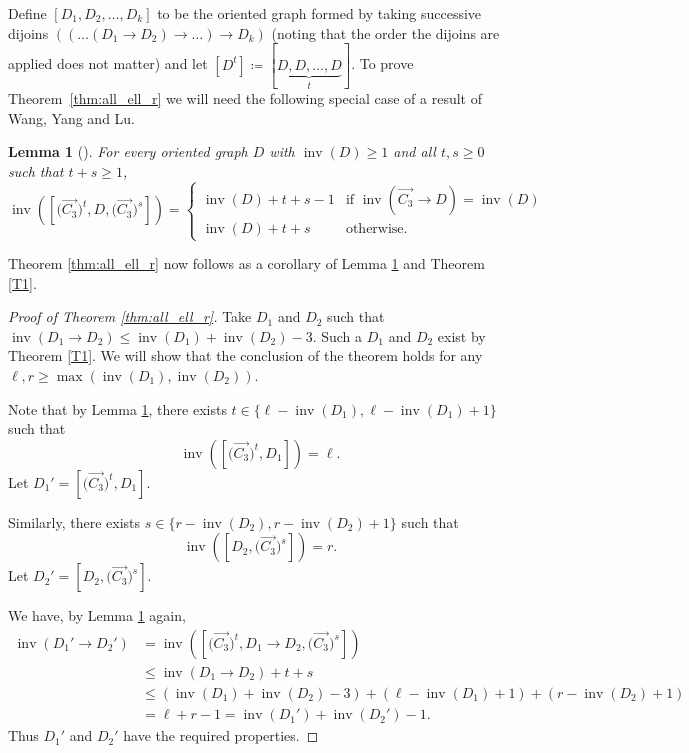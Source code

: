 \documentclass[10pt,a4paper]{amsart}
\numberwithin{equation}{section}
\theoremstyle{plain}
\newtheorem{lemma}[thm]{Lemma}
\theoremstyle{remark}
\theoremstyle{definition}
\newcommand{\lb}{\left(}
\newcommand{\rb}{\right)}
\newcommand{\inv}{\operatorname{inv}}
\begin{document}
Define $[D_1,D_2,\ldots,D_k]$ to be the oriented graph formed by taking successive dijoins $((\ldots(D_1 \rightarrow D_2) \rightarrow \ldots )\rightarrow D_k)$ (noting that the order the dijoins are applied does not matter) and let $[D^t] \coloneqq [\underbrace{D,D,\ldots,D}_{t}]$.
To prove Theorem~\ref{thm:all_ell_r} we will need the following special case of a result of Wang, Yang and Lu.

\begin{lemma}[{\cite[Corollary 1.10]{Wang}}]\label{lem:C3_dijoins}
For every oriented graph $D$ with $\inv(D) \ge 1$ and all $t,s \ge 0$ such that $t+s\ge 1$,
\begin{equation*}
\inv\lb\left[\big(\overrightarrow{C_3}\big)^t,D,\big(\overrightarrow{C_3}\big)^s\right] \rb = \begin{cases} \inv(D) + t +s-1 &\text{if $\inv(\overrightarrow{C_3}\rightarrow D) = \inv(D)$}\\
\inv(D) + t+s &\text{otherwise.}
\end{cases} 
\end{equation*}
\end{lemma}

Theorem \ref{thm:all_ell_r} now follows as a corollary of Lemma \ref{lem:C3_dijoins} and Theorem \ref{T1}.

\begin{proof}[Proof of Theorem \ref{thm:all_ell_r}]
    Take $D_1$ and $D_2$ such that $\inv(D_1 \rightarrow D_2) \le \inv(D_1) + \inv(D_2) - 3$. Such a $D_1$ and $D_2$ exist by Theorem \ref{T1}. We will show that the conclusion of the theorem holds for any $\ell,r \ge \max\lb\inv(D_1),\inv(D_2)\rb$.
    
    Note that by Lemma \ref{lem:C3_dijoins}, there exists $t \in \{\ell - \inv(D_1), \ell - \inv(D_1)+1\}$ such that 
    \begin{equation*}
\inv\lb\left[\big(\overrightarrow{C_3}\big)^{t},D_1\right] \rb = \ell.
\end{equation*}
Let $D_1' = \left[\big(\overrightarrow{C_3}\big)^{t},D_1\right]$.

Similarly, there exists $s\in \{r - \inv(D_2), r - \inv(D_2)+1\}$ such that 
    \begin{equation*}
\inv\lb\left[D_2,\big(\overrightarrow{C_3}\big)^{s}\right] \rb = r.
\end{equation*}
Let $D_2' = \left[D_2,\big(\overrightarrow{C_3}\big)^{s}\right] $.

We have, by Lemma \ref{lem:C3_dijoins} again,
\begin{align*}
\inv(D_1'\rightarrow D_2') &= \inv\left(\left[\big(\overrightarrow{C_3}\big)^t,D_1\rightarrow D_2,\big(\overrightarrow{C_3}\big)^s\right] 
\right) \\
&\le \inv(D_1\rightarrow D_2) + t + s \\
&\le (\inv(D_1) + \inv(D_2)-3) + (\ell - \inv(D_1)+1) +  (r - \inv(D_2)+1) \\
& = \ell + r - 1 = \inv(D_1') + \inv(D_2') -1. 
\end{align*}
Thus $D_1'$ and $D_2'$ have the required properties.
\end{proof}
 
\end{document}
